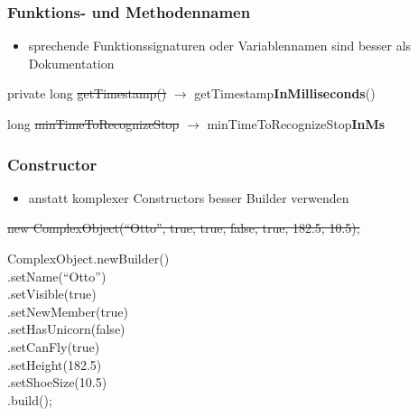 \begin{frame}
\frametitle{Funktions- und Methodennamen}
  \begin{itemize}
    \item sprechende Funktionssignaturen oder Variablennamen sind besser als Dokumentation
    \end{itemize}
  \vspace{4mm}
  \begin{Beispiel}
  \vspace{2mm}
  \par private long \sout{getTimestamp()} $\rightarrow$ getTimestamp\textbf{InMilliseconds}()
  \vspace{2mm}
  \par long \sout{minTimeToRecognizeStop} $\rightarrow$ minTimeToRecognizeStop\textbf{InMs}
  \vspace{2mm}
  \end{Beispiel}
\end{frame}

\begin{frame}
\frametitle{Constructor}
  \begin{itemize}
    \item anstatt komplexer Constructors besser Builder verwenden
    \end{itemize}
  \begin{Beispiel}
  \par \sout{new ComplexObject(``Otto'', true, true, false, true, 182.5, 10.5);}
  \vspace{2mm}
  \par ComplexObject.newBuilder()\\
    \hspace*{24.5mm}.setName(``Otto'')\\
    \hspace*{24.5mm}.setVisible(true)\\
    \hspace*{24.5mm}.setNewMember(true)\\
    \hspace*{24.5mm}.setHasUnicorn(false)\\
    \hspace*{24.5mm}.setCanFly(true)\\
    \hspace*{24.5mm}.setHeight(182.5)\\
    \hspace*{24.5mm}.setShoeSize(10.5)\\
    \hspace*{24.5mm}.build();
  \end{Beispiel}
\end{frame}

